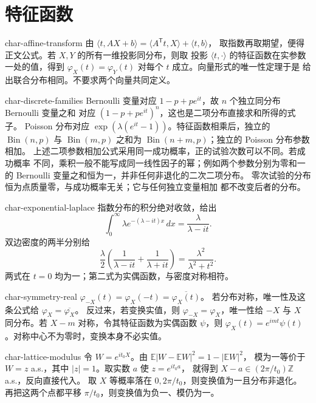 \chapter{特征函数}

\begin{solution}{char-affine-transform}
由 $\langle t,AX+b\rangle=\langle A^{\mathsf T}t,X\rangle+\langle t,b\rangle$，
取指数再取期望，便得正文公式。若 $X,Y$ 的所有一维投影同分布，则取
投影 $\langle t,\cdot\rangle$ 的特征函数在实参数一处的值，得到
$\varphi_X(t)=\varphi_Y(t)$ 对每个 $t$ 成立。向量形式的唯一性定理于是
给出联合分布相同。不要求两个向量共同定义。
\end{solution}

\begin{solution}{char-discrete-families}
Bernoulli 变量对应 $1-p+pe^{it}$，故 $n$ 个独立同分布 Bernoulli 变量之和
对应 $(1-p+pe^{it})^n$，这也是二项分布直接求和所得的式子。
Poisson 分布对应 $\exp(\lambda(e^{it}-1))$。特征函数相乘后，独立的
$\operatorname{Bin}(n,p)$ 与 $\operatorname{Bin}(m,p)$ 之和为
$\operatorname{Bin}(n+m,p)$；独立的 Poisson 分布参数相加。
上述二项参数相加公式采用同一成功概率，正的试验次数可以不同。若成功概率
不同，乘积一般不能写成同一线性因子的幂；例如两个参数分别为零和一的
Bernoulli 变量之和恒为一，并非任何非退化的二次二项分布。
零次试验的分布恒为点质量零，与成功概率无关；它与任何独立变量相加
都不改变后者的分布。
\end{solution}

\begin{solution}{char-exponential-laplace}
指数分布的积分绝对收敛，给出
\[
 \int_0^\infty\lambda e^{-(\lambda-it)x}\,dx
   =\frac{\lambda}{\lambda-it}.
\]
双边密度的两半分别给
\[
 \frac\lambda2\left(\frac1{\lambda-it}+\frac1{\lambda+it}\right)
   =\frac{\lambda^2}{\lambda^2+t^2}.
\]
两式在 $t=0$ 均为一；第二式为实偶函数，与密度对称相符。
\end{solution}

\begin{solution}{char-symmetry-real}
$\varphi_{-X}(t)=\varphi_X(-t)=\overline{\varphi_X(t)}$。
若分布对称，唯一性及这条公式给 $\varphi_X=\overline{\varphi_X}$。
反过来，若变换实值，则 $\varphi_{-X}=\varphi_X$，唯一性给 $-X$ 与 $X$
同分布。若 $X-m$ 对称，令其特征函数为实偶函数 $\psi$，则
$\varphi_X(t)=e^{imt}\psi(t)$。对称中心不为零时，变换本身不必实值。
\end{solution}

\begin{solution}{char-lattice-modulus}
令 $W=e^{it_0X}$。由 $\mathbb E|W-\mathbb EW|^2=1-|\mathbb EW|^2$，
模为一等价于 $W=z$ a.s.，其中 $|z|=1$。取实数 $a$ 使 $z=e^{it_0a}$，
就得到 $X-a\in(2\pi/t_0)\mathbb Z$ a.s.，反向直接代入。
取 $X$ 等概率落在 $0,2\pi/t_0$，则变换值为一且分布非退化。
再把这两个点都平移 $\pi/t_0$，则变换值为负一、模仍为一。
\end{solution}

